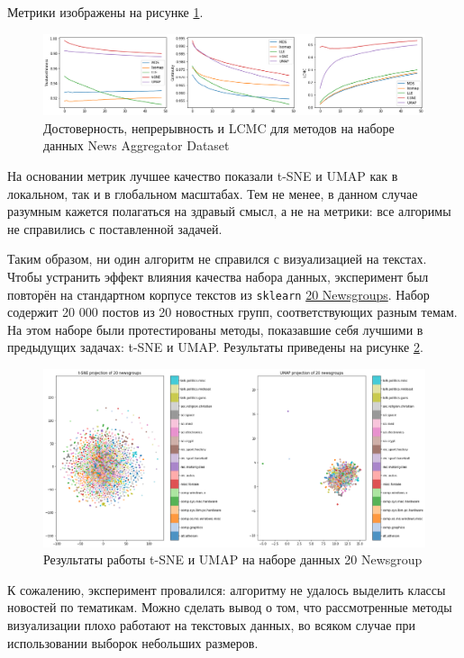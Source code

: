 \documentclass[10pt, a4paper]{extarticle}
\newcommand{\code}[1]{\texttt{#1}}
\begin{document}
Метрики изображены на рисунке \ref{fig:metrics_news}.
\begin{figure}[h!]
    \centering
    \includegraphics[width=\linewidth]{fmnist_metrics.png}
    \caption{Достоверность, непрерывность и LCMC для методов на наборе данных News Aggregator Dataset}
    \label{fig:metrics_news}
\end{figure}
На основании метрик лучшее качество показали t-SNE и UMAP как в локальном, так и в глобальном масштабах. Тем не менее, в данном случае разумным кажется полагаться на здравый смысл, а не на метрики: все алгоримы не справились с поставленной задачей. 

Таким образом, ни один алгоритм не справился с визуализацией на текстах. Чтобы устранить эффект влияния качества набора данных, эксперимент был повторён на стандартном корпусе текстов из \code{sklearn} \href{http://qwone.com/~jason/20Newsgroups/}{20 Newsgroups}. Набор содержит 20 000 постов из 20 новостных групп, соответствующих разным темам. 
На этом наборе были протестированы методы, показавшие себя лучшими в предыдущих задачах: t-SNE и UMAP. Результаты приведены на рисунке \ref{fig:firework}.

\begin{figure}[h!]
    \vspace{1em}
    \centering
    \includegraphics[width=\linewidth]{fireworks.png}
    \caption{Результаты работы t-SNE и UMAP на наборе данных 20 Newsgroup}
    \label{fig:firework}
\end{figure}

К сожалению, эксперимент провалился: алгоритму не удалось выделить классы новостей по тематикам. Можно сделать вывод о том, что рассмотренные методы визуализации плохо работают на текстовых данных, во всяком случае при использовании выборок небольших размеров.
\end{document}
